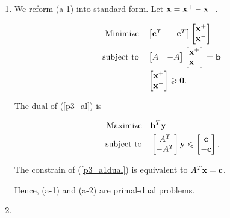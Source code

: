 \documentclass[12pt]{article}
\begin{document}
\begin{enumerate}
\item

We reform (a-1) into standard form. Let $\textbf x = \textbf x^+ - \textbf x^-$.

\begin{equation}\label{p3_al}
\begin{aligned}
 \quad \text{Minimize} \quad & \begin{bmatrix}
\textbf c^T & -\textbf c^T
\end{bmatrix}
\begin{bmatrix}
\textbf x^+ \\ \textbf x^-
\end{bmatrix} \\
\text{subject\  to} \quad & \begin{bmatrix}
A & -A
\end{bmatrix}
\begin{bmatrix}
\textbf x^+ \\ \textbf x^-
\end{bmatrix} = \textbf b \\
&  \begin{bmatrix}
\textbf x^+ \\ \textbf x^- 
\end{bmatrix}\geqslant \textbf 0.
\end{aligned}
\end{equation}

The dual of (\ref{p3_al}) is

\begin{equation}\label{p3_a1dual}
\begin{aligned}
 \quad \text{Maximize} \quad & \textbf b^T\textbf y\\
\text{subject\  to} \quad & \begin{bmatrix}
A^T \\ -A^T
\end{bmatrix} \textbf y \leqslant \begin{bmatrix}
\textbf{c} \\ -\textbf c
\end{bmatrix}.
\end{aligned}
\end{equation}

The constrain of (\ref{p3_a1dual}) is equivalent to $A^T\textbf x = \textbf c$.

Hence, (a-1) and (a-2) are primal-dual problems.

\item


\end{enumerate}
\end{document}
